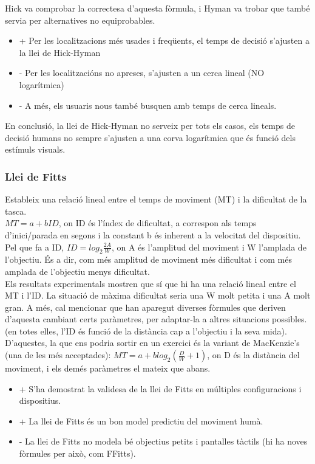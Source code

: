 \documentclass[12pt]{article}
\begin{document}
    \hfill \break
    Hick va comprobar la correctesa d'aquesta fòrmula, i Hyman va trobar que també servia per alternatives no equiprobables.
    
    
    \begin{itemize}
        \item + Per les localitzacions més usades i freqüents, el temps de decisió s'ajusten a la llei de Hick-Hyman
        \item - Per les localitzacións no apreses, s'ajusten a un cerca lineal (NO logarítmica)
        \item - A més, els usuaris nous també busquen amb temps de cerca lineals. 
    \end{itemize}

    En conclusió, la llei de Hick-Hyman no serveix per tots els casos, els temps de decisió humans no sempre s'ajusten a una corva 
    logarítmica que és funció dels estímuls visuals.
    \newpage

    \subsubsection{Llei de Fitts}
    Estableix una relació lineal entre el temps de moviment (MT) i la dificultat de la tasca.
    \\
    $MT = a + b ID$, on ID és l'índex de dificultat, a correspon als temps d'inici/parada en segons i la constant b 
    és inherent a la velocitat del dispositiu. Pel que fa a ID, $ID = log_2{\frac{2A}{W}}$, on A és l'amplitud del moviment i 
    W l'amplada de l'objectiu. És a dir, com més amplitud de moviment més dificultat i com més amplada de l'objectiu menys dificultat.
    \\
    Els resultats experimentals mostren que sí que hi ha una relació lineal entre el MT i l'ID. La situació de màxima dificultat seria
    una W molt petita i una A molt gran. A més, cal mencionar que han aparegut diverses fòrmules que deriven d'aquesta cambiant certs paràmetres,
    per adaptar-la a altres situacions possibles. (en totes elles, l'ID és funció de la distància cap a l'objectiu i la seva mida). D'aquestes, la que ens podria
    sortir en un exercici és la variant de MacKenzie's (una de les més acceptades): $MT = a + blog_2(\frac{D}{W} + 1)$, on D és la distància del moviment, i els demés paràmetres el mateix que abans.

    \begin{itemize}
        \item + S'ha demostrat la validesa de la llei de Fitts en múltiples configuracions i dispositius.
        \item + La llei de Fitts és un bon model predictiu del moviment humà.
        \item - La llei de Fitts no modela bé objectius petits i pantalles tàctils (hi ha noves fòrmules per això, com FFitts).
    \end{itemize}
\end{document}

